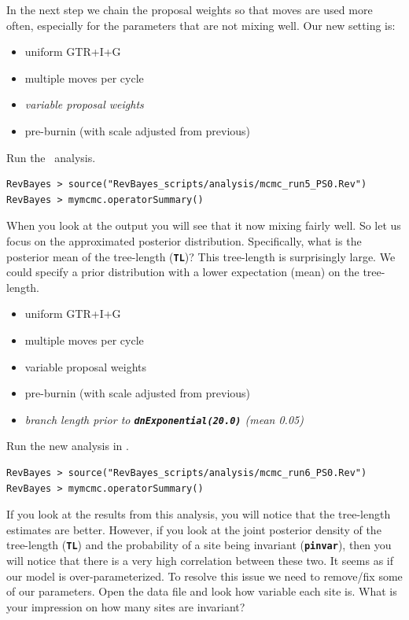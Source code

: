 \documentclass[11pt]{article}
\newcommand{\cl}[1]{{\texttt{\textbf{#1}}}}
\begin{document}
In the next step we chain the proposal weights so that moves are used more often, especially for the parameters that are not mixing well.
Our new setting is:
\begin{itemize}
\item{uniform GTR+I+G}
\item{multiple moves per cycle}
\item{\it variable proposal weights}
\item{pre-burnin (with scale adjusted from previous)}
\end{itemize}
Run the \RevBayes~analysis.
{\tt \begin{snugshade*}
\begin{lstlisting}
RevBayes > source("RevBayes_scripts/analysis/mcmc_run5_PS0.Rev")
RevBayes > mymcmc.operatorSummary()
\end{lstlisting}
\end{snugshade*}}
When you look at the output you will see that it now mixing fairly well.
So let us focus on the approximated posterior distribution.
Specifically, what is the posterior mean of the tree-length (\cl{TL})?
This tree-length is surprisingly large. 
We could specify a prior distribution with a lower expectation (mean) on the tree-length.
\begin{itemize}
\item{uniform GTR+I+G}
\item{multiple moves per cycle}
\item{variable proposal weights}
\item{pre-burnin (with scale adjusted from previous)}
\item{\it branch length prior to \cl{dnExponential(20.0)} (mean 0.05)}
\end{itemize}
Run the new analysis in \RevBayes.
{\tt \begin{snugshade*}
\begin{lstlisting}
RevBayes > source("RevBayes_scripts/analysis/mcmc_run6_PS0.Rev")
RevBayes > mymcmc.operatorSummary()
\end{lstlisting}
\end{snugshade*}}
If you look at the results from this analysis, you will notice that the tree-length estimates are better.
However, if you look at the joint posterior density of the tree-length (\cl{TL}) and the probability of a site being invariant (\cl{pinvar}), then you will notice that there is a very high correlation between these two.
It seems as if our model is over-parameterized.
To resolve this issue we need to remove/fix some of our parameters.
Open the data file and look how variable each site is. What is your impression on how many sites are invariant?
\end{document}
